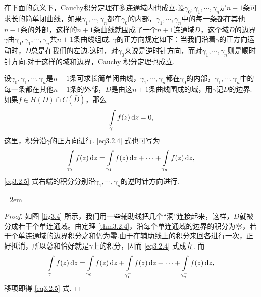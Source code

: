在下面的意义下，Cauchy积分定理在多连通域内也成立.设$\gamma_0,\gamma_1,\cdots,\gamma_n$是$n+1$条可求长的简单闭曲线，如果$\gamma_1,\cdots,\gamma_n$都在$\gamma_0$的内部，$\gamma_1,\cdots,\gamma_n$中的每一条都在其他$n-1$条的外部，这样的$n+1$条曲线就围成了一个$n+1$连通域$D$，这个域$D$的边界$\gamma$由$\gamma_0,\gamma_1,\cdots,\gamma_n$共$n+1$条曲线组成. $\gamma$的正方向规定如下：当我们沿着$\gamma$的正方向运动时，$D$总是在我们的左边.这时，对$\gamma_0$来说是逆时针方向，而对$\gamma_1,\cdots,\gamma_n$则是顺时针方向.对于这样的域和边界，Cauchy 积分定理也成立.
\begin{theorem}\label{thm3.2.5}
  设$\gamma_0,\gamma_1,\cdots,\gamma_n$是$n+1$条可求长简单闭曲线，$\gamma_1,\cdots,\gamma_n$都在$\gamma_0$的内部，$\gamma_1,\cdots,\gamma_n$中的每一条都在其他$n-1$条的外部，$D$是由这$n+1$条曲线围成的域，用$\gamma$记$D$的边界.如果$f\in H(D)\cap C(\bar D)$，那么
  \begin{equation}\label{eq3.2.4}
    \int\limits_\gamma f(z)\mathop{}\!\mathrm dz = 0,
  \end{equation}
  这里，积分沿$\gamma$的正方向进行. \eqref{eq3.2.4} 式也可写为
  \begin{equation}\label{eq3.2.5}
    \int\limits_{\gamma_0}f(z)\mathop{}\!\mathrm dz=\int\limits_{\gamma_1}f(z)\mathop{}\!\mathrm dz +
    \cdots+\int\limits_{\gamma_n}f(z)\mathop{}\!\mathrm dz,
  \end{equation}
  \eqref{eq3.2.5} 式右端的积分分别沿$\gamma_1,\cdots,\gamma_n$的逆时针方向进行.
\end{theorem}
\noindent\begin{minipage}{0.65\textwidth}
  \parindent=2em
\begin{proof}
  如图 \ref{fig3.4} 所示，我们用一些辅助线把几个``洞''连接起来，这样，$D$就被分成若干个单连通域。由定理 \ref{thm3.2.4}，沿每个单连通域的边界的积分为零，若干个单连通域的边界积分之和仍为零.由于在辅助线上的积分来回各进行一次，正好抵消，所以总和恰好就是$\gamma$上的积分，因而 \eqref{eq3.2.4} 式成立. 而
  \begin{equation*}
    \int\limits_{\gamma}f(z)\mathop{}\!\mathrm dz = \int\limits_{\gamma_0}f(z)\mathop{}\!\mathrm dz + \int\limits_{\gamma_1^-}f(z)\mathop{}\!\mathrm dz +
    \cdots + \int\limits_{\gamma_n^-}f(z)\mathop{}\!\mathrm dz,
  \end{equation*}
  移项即得 \eqref{eq3.2.5} 式.
\end{proof}
\end{minipage}
